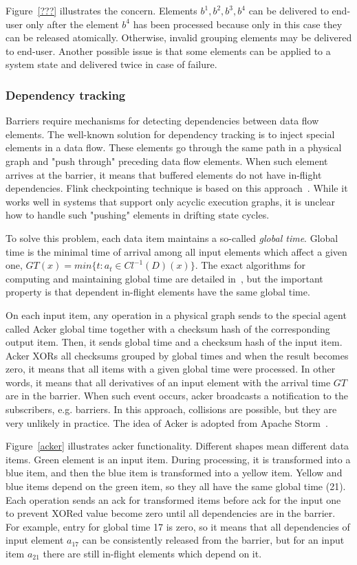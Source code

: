 Figure~\ref{???} illustrates the concern. Elements $b^{1},b^{2},b^{3},b^{4}$ can be delivered to end-user only after the element $b^{4}$ has been processed because only in this case they can be released atomically. Otherwise, invalid grouping elements may be delivered to end-user. Another possible issue is that some elements can be applied to a system state and delivered twice in case of failure. 

\subsubsection{Dependency tracking}

Barriers require mechanisms for detecting dependencies between data flow elements. The well-known solution for dependency tracking is to inject special elements in a data flow. These elements go through the same path in a physical graph and "push through" preceding data flow elements. When such element arrives at the barrier, it means that buffered elements do not have in-flight dependencies. Flink checkpointing technique is based on this approach~\cite{Carbone:2017:SMA:3137765.3137777}. While it works well in systems that support only acyclic execution graphs, it is unclear how to handle such "pushing" elements in drifting state cycles. 

To solve this problem, each data item maintains a so-called {\em global time}. Global time is the minimal time of arrival among all input elements which affect a given one,  $GT(x)=min\{t:a_t\in Cl^{-1}(D)(x)\}$. The exact algorithms for computing and maintaining global time are detailed in~\cite{we2018adbis}, but the important property is that dependent in-flight elements have the same global time. 

On each input item, any operation in a physical graph sends to the special agent called Acker global time together with a checksum hash of the corresponding output item. Then, it sends global time and a checksum hash of the input item. Acker XORs all checksums grouped by global times and when the result becomes zero, it means that all items with a given global time were processed. In other words, it means that all derivatives of an input element with the arrival time $GT$ are in the barrier. When such event occurs, acker broadcasts a notification to the subscribers, e.g. barriers. In this approach, collisions are possible, but they are very unlikely in practice. The idea of Acker is adopted from Apache Storm~\cite{apache:storm}.

Figure~\ref{acker} illustrates acker functionality. Different shapes mean different data items. Green element is an input item. During processing, it is transformed into a blue item, and then the blue item is transformed into a yellow item. Yellow and blue items depend on the green item, so they all have the same global time (21). Each operation sends an ack for transformed items before ack for the input one to prevent XORed value become zero until all dependencies are in the barrier. For example, entry for global time 17 is zero, so it means that all dependencies of input element $a_{17}$ can be consistently released from the barrier, but for an input item $a_{21}$ there are still in-flight elements which depend on it.

